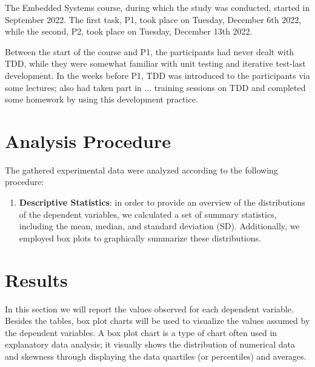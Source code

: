 The Embedded Systems course, during which the study was conducted, started in September 2022. The first task, P1, took place on Tuesday, December 6th 2022, while the second, P2, took place on Tuesday, December 13th 2022.

Between the start of the course and P1, the participants had never dealt with TDD, while they were somewhat familiar with unit testing and iterative test-last development. In the weeks before P1, TDD was introduced to the participants via some lectures; also had taken part in ... training sessions on TDD and completed some homework by using this development practice.



\section {Analysis Procedure}
The gathered experimental data were analyzed according to the following procedure:
\begin{enumerate}
    \item \textbf{Descriptive Statistics}: in order to provide an overview of the distributions of the dependent variables, we calculated a set of summary statistics, including the mean, median, and standard deviation (SD). Additionally, we employed box plots to graphically summarize these distributions.
\end{enumerate}


\section{Results}
In this section we will report the values observed for each dependent variable.
Besides the tables, box plot charts will be used to visualize the values assumed by the dependent variables.
A box plot chart is a type of chart often used in explanatory data analysis; it visually shows the distribution of numerical data and skewness through displaying the data quartiles (or percentiles) and averages.

